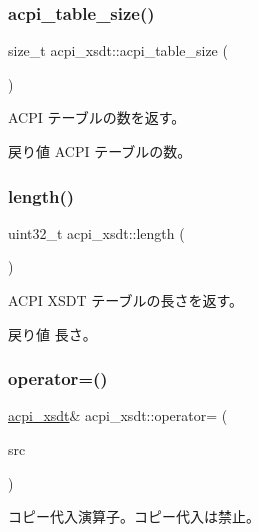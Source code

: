 \subsubsection{\texorpdfstring{acpi\+\_\+table\+\_\+size()}{acpi\_table\_size()}}
{\footnotesize\ttfamily size\+\_\+t acpi\+\_\+xsdt\+::acpi\+\_\+table\+\_\+size (\begin{DoxyParamCaption}{ }\end{DoxyParamCaption})}

A\+C\+PI テーブルの数を返す。 \begin{DoxyReturn}{戻り値}
A\+C\+PI テーブルの数。 
\end{DoxyReturn}
\hypertarget{classacpi__xsdt_a3f0e588ac85030abbd73fa724402f436}{}\label{classacpi__xsdt_a3f0e588ac85030abbd73fa724402f436} 
\subsubsection{\texorpdfstring{length()}{length()}}
{\footnotesize\ttfamily uint32\+\_\+t acpi\+\_\+xsdt\+::length (\begin{DoxyParamCaption}{ }\end{DoxyParamCaption})}

A\+C\+PI X\+S\+DT テーブルの長さを返す。 \begin{DoxyReturn}{戻り値}
長さ。 
\end{DoxyReturn}
\hypertarget{classacpi__xsdt_a1a1897128b1afed0bd26d12465a4c98f}{}\label{classacpi__xsdt_a1a1897128b1afed0bd26d12465a4c98f} 
\subsubsection{\texorpdfstring{operator=()}{operator=()}\hspace{0.1cm}{\footnotesize\ttfamily [1/2]}}
{\footnotesize\ttfamily \hyperlink{classacpi__xsdt}{acpi\+\_\+xsdt}\& acpi\+\_\+xsdt\+::operator= (\begin{DoxyParamCaption}\item[{const \hyperlink{classacpi__xsdt}{acpi\+\_\+xsdt} \&}]{src }\end{DoxyParamCaption})\hspace{0.3cm}{\ttfamily [delete]}}

コピー代入演算子。コピー代入は禁止。 \hypertarget{classacpi__xsdt_a058721e1a87b15e0939a1efa9d80b9e2}{}\label{classacpi__xsdt_a058721e1a87b15e0939a1efa9d80b9e2} 
